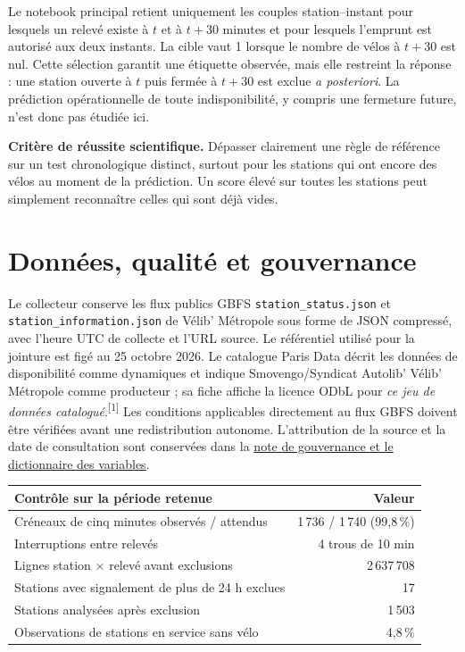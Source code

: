 \documentclass[11pt,a4paper]{article}
\newcommand{\source}[1]{\textsuperscript{\color{turquoise}[#1]}}
\newcommand{\callout}[1]{\noindent\colorbox{pale}{\parbox{\dimexpr\linewidth-2\fboxsep\relax}{\vspace{0.4em}#1\vspace{0.4em}}}}
\begin{document}
Le notebook principal retient uniquement les couples station--instant pour lesquels un relevé existe à $t$ et à $t+30$ minutes et pour lesquels l'emprunt est autorisé aux deux instants. La cible vaut 1 lorsque le nombre de vélos à $t+30$ est nul. Cette sélection garantit une étiquette observée, mais elle restreint la réponse : une station ouverte à $t$ puis fermée à $t+30$ est exclue \emph{a posteriori}. La prédiction opérationnelle de toute indisponibilité, y compris une fermeture future, n'est donc pas étudiée ici.

\callout{\textbf{Critère de réussite scientifique.} Dépasser clairement une règle de référence sur un test chronologique distinct, surtout pour les stations qui ont encore des vélos au moment de la prédiction. Un score élevé sur toutes les stations peut simplement reconnaître celles qui sont déjà vides.}

\section{Données, qualité et gouvernance}

Le collecteur conserve les flux publics GBFS \texttt{station\_status.json} et \texttt{station\_information.json} de Vélib' Métropole sous forme de JSON compressé, avec l'heure UTC de collecte et l'URL source. Le référentiel utilisé pour la jointure est figé au 25 octobre 2026. Le catalogue Paris Data décrit les données de disponibilité comme dynamiques et indique Smovengo/Syndicat Autolib' Vélib' Métropole comme producteur ; sa fiche affiche la licence ODbL pour \emph{ce jeu de données catalogué}.\source{1} Les conditions applicables directement au flux GBFS doivent être vérifiées avant une redistribution autonome. L'attribution de la source et la date de consultation sont conservées dans la \href{https://github.com/G-Akram01/velib-kit-data-science/blob/main/docs/gouvernance-donnees.md}{note de gouvernance et le dictionnaire des variables}.

\begin{center}
\begin{tabularx}{\linewidth}{@{}Xr@{}}
\toprule
\textbf{Contrôle sur la période retenue} & \textbf{Valeur}\tabularnewline
\midrule
Créneaux de cinq minutes observés / attendus & 1\,736 / 1\,740 (99,8\,\%)\\
Interruptions entre relevés & 4 trous de 10 min\\
Lignes station $\times$ relevé avant exclusions & 2\,637\,708\\
Stations avec signalement de plus de 24 h exclues & 17\\
Stations analysées après exclusion & 1\,503\\
Observations de stations en service sans vélo & 4,8\,\%\\
\bottomrule
\end{tabularx}
\end{center}
\end{document}
